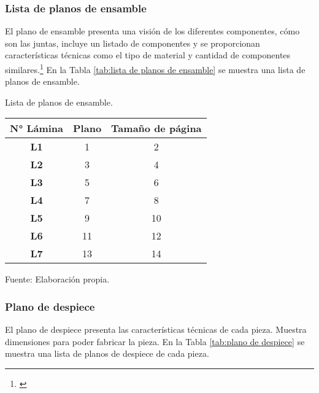\subsubsection{Lista de planos de ensamble}

El plano de ensamble presenta una visión de los diferentes componentes, cómo son las juntas, incluye un listado de componentes y se proporcionan características técnicas como el  tipo de material y cantidad de componentes similares.\footnote{\cite{Goetsch2010}} En la Tabla \ref{tab:lista de planos de ensamble} se muestra una lista de planos de ensamble.


\begin{mytable}[H]
	\centering
	\caption{Lista de planos de ensamble.}
	\label{tab:lista de planos de ensamble}
	\begin{tabular}{|c|c|c|}
		\hline
		\textbf{N° Lámina} & \textbf{Plano} & \textbf{Tamaño de página} \\ \hline
		\textbf{L1}        & 1              & 2             \\ \hline
		\textbf{L2}        & 3              & 4             \\ \hline
		\textbf{L3}        & 5              & 6             \\ \hline
		\textbf{L4}        & 7              & 8             \\ \hline
		\textbf{L5}        & 9              & 10            \\ \hline
		\textbf{L6}        & 11             & 12            \\ \hline
		\textbf{L7}        & 13             & 14            \\ \hline
	\end{tabular}
	\begin{flushleft}	
	Fuente: Elaboración propia.
\end{flushleft}
\end{mytable}


\subsubsection{Plano de despiece}

El plano de despiece presenta las características técnicas de cada pieza. Muestra dimensiones para poder fabricar la pieza. En la Tabla \ref{tab:plano de despiece} se muestra una lista de planos de despiece de cada pieza.

